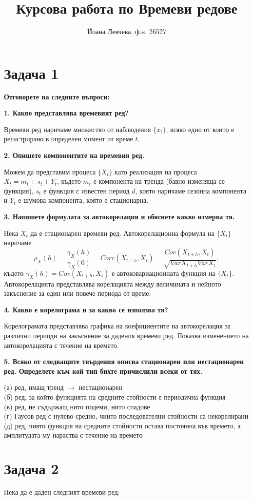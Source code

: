 \documentclass{article}
\title{Курсова работа по Времеви редове}
\author{Йоана Левчева, ф.н. 26527}
\begin{document}
\maketitle

\section*{Задача 1}
\textbf{Отговорете на следните въпроси:}
\begin{flushleft}

\textbf{1. Какво представлява времевият ред?}
\begin{flushleft}
Времеви ред наричаме множество от наблюдения $\{ x_t \}$, всяко едно от които е регистрирано в определен момент от време $t$.
\end{flushleft}

\textbf{2. Опишете компонентите на времевия ред.}
\begin{flushleft}
Можем да представим процеса $\{X_t \}$ като реализация на процеса $X_t = m_t + s_t + Y_t$, където $m_t$ е компонента на тренда (бавно изменяща се функция), $s_t$ е функция с известен период $d$, която наричаме сезонна компонента и $Y_t$ е шумова компонента, която е стационарна.
\end{flushleft}

\textbf{3. Напишете формулата за автокорелация и обяснете какво измерва тя.}
\begin{flushleft}
Нека $X_t$ да е стационарен времеви ред. Автокорелационна формула на $\{X_t \}$ наричаме $$\rho_{X}(h) = \frac{\gamma_{X}(h)}{\gamma_{X}(0)} = Corr(X_{t+h}, X_t) = \frac{Cov(X_{t+h}, X_t)}{\sqrt{Var X_{t+h}Var X_t}},$$ където $\gamma_{X}(h) = Cov(X_{t+h}, X_t)$ е автоковариационната функция на $\{ X_t \}$. Автокорелацията представлява корелацията между величината и нейното закъснение за един или повече периода от време.
\end{flushleft}

\textbf{4. Какво е корелограма и за какво се използва тя?}
\begin{flushleft}
Корелограмата представлява графика на коефициентите на автокорелация за различни периоди на закъснение за дадения времеви ред. Показва изменението на автокорелацията с течение на времето. 
\end{flushleft}

\textbf{5. Всяко от следващите твърдения описва стационарен или нестационарен ред. Определете към кой тип бихте причислили всеки от тях.}
\begin{flushleft}
(а) ред, имащ тренд $\rightarrow$ нестационарен \\
(б) ред, за който функцията на средните стойности е периодична функция \\
(в) ред, не съдържащ нито подеми, нито спадове \\
(г) Гаусов ред с нулево средно, чиито последователни стойности са некорелирани \\
(д) ред, чиято функция на средните стойности остава постоянна във времето, а амплитудата му нараства с течение на времето
\end{flushleft}

\end{flushleft}

\section*{Задача 2}
Нека да е даден следният времеви ред:
\end{document}
